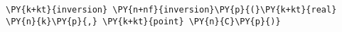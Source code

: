 \begin{Verbatim}[commandchars=\\\{\}]
    \PY{k+kt}{inversion} \PY{n+nf}{inversion}\PY{p}{(}\PY{k+kt}{real} \PY{n}{k}\PY{p}{,} \PY{k+kt}{point} \PY{n}{C}\PY{p}{)}
\end{Verbatim}
